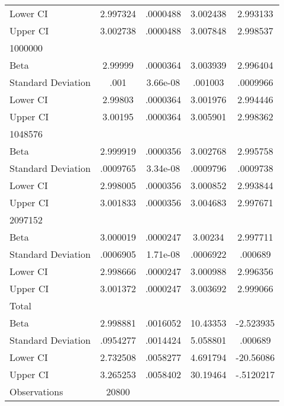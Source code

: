 {\begin{tabular}{l*{1}{cccc}}
Lower CI            &    2.997324&    .0000488&    3.002438&    2.993133\\
Upper CI            &    3.002738&    .0000488&    3.007848&    2.998537\\
\hline
1000000             &            &            &            &            \\
Beta                &     2.99999&    .0000364&    3.003939&    2.996404\\
Standard Deviation  &        .001&    3.66e-08&     .001003&    .0009966\\
Lower CI            &     2.99803&    .0000364&    3.001976&    2.994446\\
Upper CI            &     3.00195&    .0000364&    3.005901&    2.998362\\
\hline
1048576             &            &            &            &            \\
Beta                &    2.999919&    .0000356&    3.002768&    2.995758\\
Standard Deviation  &    .0009765&    3.34e-08&    .0009796&    .0009738\\
Lower CI            &    2.998005&    .0000356&    3.000852&    2.993844\\
Upper CI            &    3.001833&    .0000356&    3.004683&    2.997671\\
\hline
2097152             &            &            &            &            \\
Beta                &    3.000019&    .0000247&     3.00234&    2.997711\\
Standard Deviation  &    .0006905&    1.71e-08&    .0006922&     .000689\\
Lower CI            &    2.998666&    .0000247&    3.000988&    2.996356\\
Upper CI            &    3.001372&    .0000247&    3.003692&    2.999066\\
\hline
Total               &            &            &            &            \\
Beta                &    2.998881&    .0016052&    10.43353&   -2.523935\\
Standard Deviation  &    .0954277&    .0014424&    5.058801&     .000689\\
Lower CI            &    2.732508&    .0058277&    4.691794&   -20.56086\\
Upper CI            &    3.265253&    .0058402&    30.19464&   -.5120217\\
\hline
Observations        &       20800&            &            &            \\
\hline\hline
\end{tabular}
}

